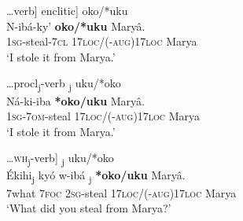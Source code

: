 \documentclass[output=paper]{langscibook}
\begin{document}
\ea \label{ex:schneider:examplesadjacencyRepeated}
\begin{xlist}

\ex \label{ex:schneider:adjacentRepeated}
\ldots verb] enclitic] oko/*uku\\
\gll N-ibá-ky' \textbf{oko/*uku} Mary\^a. \\
\textsc{1sg}-steal-\textsc{7cl} \textsc{17loc/(-aug)17loc} Marya \\
\glt `I stole it from Marya.' 

\ex \label{ex:schneider:procliticverbRepeated}
\ldots procl\textsubscript{j}-verb \underline{\hspace{0.5cm}}\textsubscript{j} uku/*oko \\
\gll Ná-ki-iba \textbf{*oko/\Checkmark uku} Mary\^a. \\
\textsc{1sg}-\textsc{7om}-steal \textsc{17loc/(-aug)17loc} Marya \\
\glt `I stole it from Marya.'
 
\ex \label{ex:schneider:whinterveningRepeated}
\ldots\textsc{wh}\textsubscript{j}-verb] \underline{\hspace{0.5cm}}\textsubscript{j} uku/*oko \\
\gll \'Ekihi\textsubscript{j} ky\'o w-ibá \underline{\hspace{0.5cm}}\textsubscript{j} \textbf{*oko/\Checkmark uku} Mary\^a. \\
7what \textsc{7foc} \textsc{2sg-}steal {  } \textsc{17loc/(-aug)17loc} Marya \\
\glt `What did you steal from Marya?' 


\end{xlist}

\z
\end{document}
